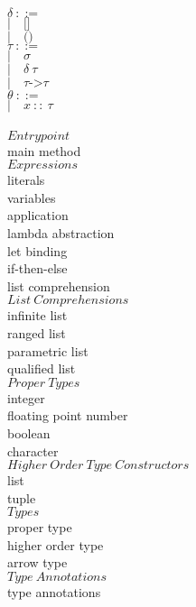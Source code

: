 \documentclass[5pt]{article}
\begin{document}
\begin{multicols}{2}
\noindent $\delta \ ::= $ \\
\hspace*{10mm} $| \quad \texttt{[]} $ \\
\hspace*{10mm} $| \quad \texttt{()} $ \\

\noindent $\tau \ ::= $ \\
\hspace*{10mm} $| \quad \sigma $ \\
\hspace*{10mm} $| \quad \delta \ \tau $ \\
\hspace*{10mm} $| \quad \tau \texttt{->} \tau $ \\

\noindent $\theta \ ::= $ \\
\hspace*{10mm} $| \quad x \ :: \  \tau $ \\
\columnbreak \\
$Entrypoint$ \\
main method \\

\noindent $Expressions$ \\
literals \\
variables \\
application \\
lambda abstraction \\
let binding \\
if-then-else \\
list comprehension \\

\noindent $List \ Comprehensions$ \\
infinite list \\
ranged list \\
parametric list \\
qualified list \\

\noindent $Proper \ Types$ \\
integer \\
floating point number \\
boolean \\
character \\

\noindent $Higher \ Order \ Type \ Constructors$ \\
list \\
tuple \\

\noindent $Types$ \\
proper type \\
higher order type \\
arrow type \\

\noindent $Type \ Annotations$ \\
type annotations \\
\end{multicols}
\end{document}
